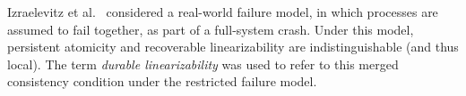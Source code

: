 Izraelevitz et al.~\cite{DBLP:conf/wdag/IzraelevitzMS16} considered
a real-world failure model, in which processes are assumed to fail together,
as part of a full-system crash.
Under this model, persistent atomicity and recoverable linearizability
are indistinguishable (and thus local).
The term \emph{durable linearizability} was used to refer to this merged
consistency condition under the restricted failure model.





